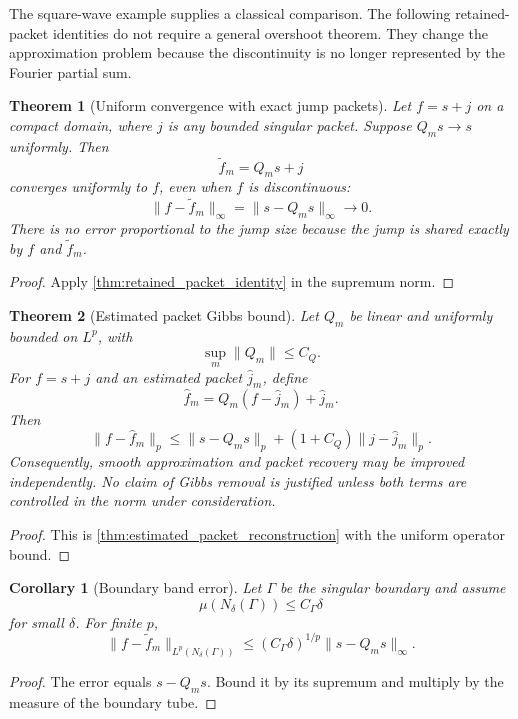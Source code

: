 \documentclass{aomart}
\newtheorem{theorem}{Theorem}[section]
\newtheorem{corollary}[corollary]{Corollary}
\theoremstyle{definition}
\theoremstyle{remark}
\begin{document}
The square-wave example supplies a classical comparison. The following retained-packet identities do not require a general overshoot theorem. They change the approximation problem because the discontinuity is no longer represented by the Fourier partial sum.

\begin{theorem}[Uniform convergence with exact jump packets]\label{thm:uniform_packet_convergence}
Let \(f=s+j\) on a compact domain, where \(j\) is any bounded singular packet. Suppose \(Q_ms\to s\) uniformly. Then
\[
\widetilde f_m=Q_ms+j
\]
converges uniformly to \(f\), even when \(f\) is discontinuous:
\[
\|f-\widetilde f_m\|_\infty
=
\|s-Q_ms\|_\infty
\longrightarrow0.
\]
There is no error proportional to the jump size because the jump is shared exactly by \(f\) and \(\widetilde f_m\).
\end{theorem}

\begin{proof}
Apply \cref{thm:retained_packet_identity} in the supremum norm.
\end{proof}

\begin{theorem}[Estimated packet Gibbs bound]\label{thm:estimated_packet_gibbs}
Let \(Q_m\) be linear and uniformly bounded on \(L^p\), with
\[
\sup_m\|Q_m\|\leq C_Q.
\]
For \(f=s+j\) and an estimated packet \(\widehat j_m\), define
\[
\widehat f_m
=Q_m(f-\widehat j_m)+\widehat j_m.
\]
Then
\[
\|f-\widehat f_m\|_p
\leq
\|s-Q_ms\|_p
+(1+C_Q)\|j-\widehat j_m\|_p.
\]
Consequently, smooth approximation and packet recovery may be improved independently. No claim of Gibbs removal is justified unless both terms are controlled in the norm under consideration.
\end{theorem}

\begin{proof}
This is \cref{thm:estimated_packet_reconstruction} with the uniform operator bound.
\end{proof}

\begin{corollary}[Boundary band error]\label{cor:boundary_band_error}
Let \(\Gamma\) be the singular boundary and assume
\[
\mu(N_\delta(\Gamma))\leq C_\Gamma\delta
\]
for small \(\delta\). For finite \(p\),
\[
\|f-\widetilde f_m\|_{L^p(N_\delta(\Gamma))}
\leq
(C_\Gamma\delta)^{1/p}
\|s-Q_ms\|_\infty.
\]
\end{corollary}

\begin{proof}
The error equals \(s-Q_ms\). Bound it by its supremum and multiply by the measure of the boundary tube.
\end{proof}
\end{document}
